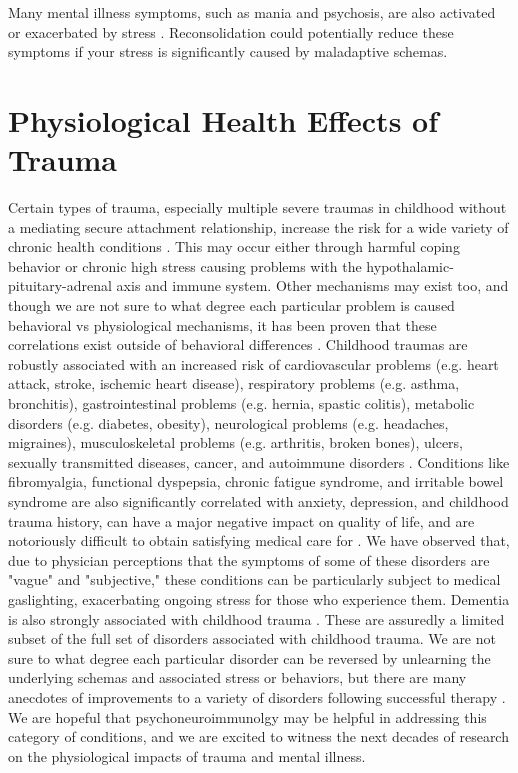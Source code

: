 \documentclass[12pt,letterpaper]{book}
\begin{document}
Many mental illness symptoms, such as mania and psychosis, are also activated or exacerbated by stress \cite{winkelPsychosisStress,Umeoka2021stressmania}. Reconsolidation could potentially reduce these symptoms if your stress is significantly caused by maladaptive schemas.
\label{psychogenic}
\section{Physiological Health Effects of Trauma}
Certain types of trauma, especially multiple severe traumas in childhood without a mediating secure attachment relationship, increase the risk for a wide variety of chronic health conditions \cite{harris2018deepest}. This may occur either through harmful coping behavior \cite{felittiACE} or chronic high stress causing problems with the hypothalamic-pituitary-adrenal axis \cite{CSAHealth} and immune system. Other mechanisms may exist too, and though we are not sure to what degree each particular problem is caused behavioral vs physiological mechanisms, it has been proven that these correlations exist outside of behavioral differences . Childhood traumas are robustly associated with an increased risk of cardiovascular problems (e.g. heart attack, stroke, ischemic heart disease), respiratory problems (e.g. asthma, bronchitis), gastrointestinal problems (e.g. hernia, spastic colitis), metabolic disorders (e.g. diabetes, obesity), neurological problems (e.g. headaches, migraines), musculoskeletal problems (e.g. arthritis, broken bones), ulcers, sexually transmitted diseases, cancer, and autoimmune disorders \cite{wegman2009meta,norman2012long,hughes2017effect}. Conditions like fibromyalgia, functional dyspepsia, chronic fatigue syndrome, and irritable bowel syndrome are also significantly correlated with anxiety, depression, and childhood trauma history, can have a major negative impact on quality of life, and are notoriously difficult to obtain satisfying medical care for \cite{henningsenSomatic,gardoki2022prevalence,silvernale2024relationship}. We have observed that, due to physician perceptions that the symptoms of some of these disorders are "vague" and "subjective," these conditions can be particularly subject to medical gaslighting, exacerbating ongoing stress for those who experience them. Dementia is also strongly associated with childhood trauma \cite{severs2023traumatic}. These are assuredly a limited subset of the full set of disorders associated with childhood trauma. We are not sure to what degree each particular disorder can be reversed by unlearning the underlying schemas and associated stress or behaviors, but there are many anecdotes of improvements to a variety of disorders following successful therapy \cite{vanderKolkBody}. We are hopeful that psychoneuroimmunolgy may be helpful in addressing this category of conditions, and we are excited to witness the next decades of research on the physiological impacts of trauma and mental illness.
\end{document}
